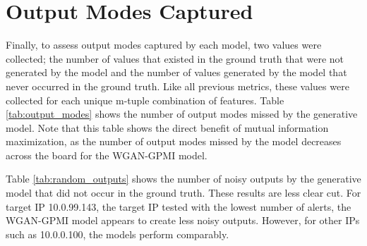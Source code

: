 \section{Output Modes Captured}
\label{sec:output}
Finally, to assess output modes captured by each model, two values were collected; the number of values that existed in the ground truth that were not generated by the model and the number of values generated by the model that never occurred in the ground truth. Like all previous metrics, these values were collected for each unique m-tuple combination of features. Table \ref{tab:output_modes} shows the number of output modes missed by the generative model. Note that this table shows the direct benefit of mutual information maximization, as the number of output modes missed by the model decreases across the board for the WGAN-GPMI model.

Table \ref{tab:random_outputs} shows the number of noisy outputs by the generative model  that did not occur in the ground truth. These results are less clear cut. For target IP 10.0.99.143, the target IP tested with the lowest number of alerts, the WGAN-GPMI model appears to create less noisy outputs. However, for other IPs such as 10.0.0.100, the models perform comparably.


